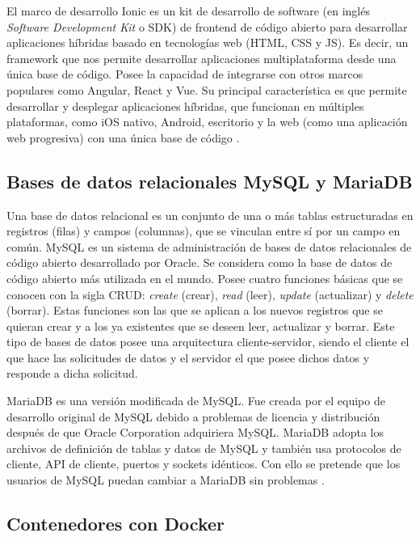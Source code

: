 El marco de desarrollo Ionic es un kit de desarrollo de software (en inglés \textit{Software Development Kit} o SDK) de frontend de código abierto para desarrollar aplicaciones híbridas basado en tecnologías web (HTML, CSS y JS). Es decir, un framework que nos permite desarrollar aplicaciones multiplataforma desde una única base de código. Posee la capacidad de integrarse con otros marcos populares como Angular, React y Vue. Su principal característica es que permite desarrollar y desplegar aplicaciones híbridas, que funcionan en múltiples plataformas, como iOS nativo, Android, escritorio y la web (como una aplicación web progresiva) con una única base de código \citep{26}.

\subsection{Bases de datos relacionales MySQL y MariaDB}

Una base de datos relacional es un conjunto de una o más tablas estructuradas en registros (filas) y campos (columnas), que se vinculan entre sí por un campo en común. MySQL es un sistema de administración de bases de datos relacionales de código abierto desarrollado por Oracle. Se considera como la base de datos de código abierto más utilizada en el mundo. Posee cuatro funciones básicas que se conocen con la sigla CRUD: \textit{create} (crear), \textit{read} (leer), \textit{update} (actualizar) y \textit{delete} (borrar). Estas funciones son las que se aplican a los nuevos registros que se quieran crear y a los ya existentes que se deseen leer, actualizar y borrar. Este tipo de bases de datos posee una arquitectura cliente-servidor, siendo el cliente el que hace las solicitudes de datos y el servidor el que posee dichos datos y responde a dicha solicitud.

MariaDB es una versión modificada de MySQL. Fue creada por el equipo de desarrollo original de MySQL debido a problemas de licencia y distribución después de que Oracle Corporation adquiriera MySQL. MariaDB adopta los archivos de definición de tablas y datos de MySQL y también usa protocolos de cliente, API de cliente, puertos y sockets idénticos. Con ello se pretende que los usuarios de MySQL puedan cambiar a MariaDB sin problemas \citep{27}.

\subsection{Contenedores con Docker}

